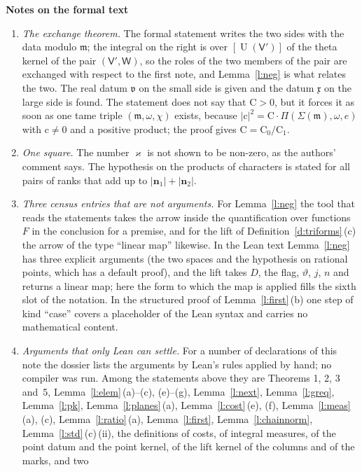 \documentclass[11pt,a4paper]{article}
\newcommand{\sect}[2]{\refstepcounter{section}\label{#2}\par\addvspace{19pt plus 4pt minus 2pt}\Needspace{7\baselineskip}%
  \noindent\llap{{\fontsize{13.2}{16}\selectfont\bfseries\color{inkfaint}\thesection}\hspace{9pt}}%
  {\fontsize{13.2}{16}\selectfont\bfseries\color{ink}#1}\par\nopagebreak\vspace{-1pt}}
\theoremstyle{plainx}
\theoremstyle{uprightx}
\newcommand{\bn}{\mathbf{n}}
\newcommand{\sW}{\mathsf{W}}
\newcommand{\sV}{\mathsf{V}}
\newcommand{\fm}{\mathfrak{m}}
\newcommand{\fv}{\mathfrak{v}}
\newcommand{\fx}{\mathfrak{x}}
\newcommand{\rc}{\mathrm{c}}
\newcommand{\rC}{\mathrm{C}}
\newcommand{\U}{\operatorname{U}}
\newcommand{\LPP}[3]{\Pi(#1,#2,#3)}
\begin{document}
\sect{Notes on the formal text}{s:notes}
\begin{enumerate}[label=\textup{\arabic*.},leftmargin=1.6em,itemsep=5pt]
\item \emph{The exchange theorem.} The formal statement writes the two sides with the data modulo $\fm$; the
integral on the right is over $[\U(\sV')]$ of the theta kernel of the pair $(\sV',\sW)$, so the roles of the two
members of the pair are exchanged with respect to the first note, and Lemma~\ref{l:neg} is what relates the two.
The real datum $\fv$ on the small side is given and the datum $\fx$ on the large side is found. The statement
does not say that $\rC>0$, but it forces it as soon as one tame triple $(\fm,\omega,\chi)$ exists, because
$|\rc|^2=\rC\cdot\LPP{\Sigma(\fm)}{\omega}{e}$ with $\rc\ne0$ and a positive product; the proof gives
$\rC=\rC_0/\rC_1$.
\item \emph{One square.} The number $\varkappa$ is not shown to be non-zero, as the authors' comment says. The
hypothesis on the products of characters is stated for all pairs of ranks that add up to $|\bn_1|+|\bn_2|$.
\item \emph{Three census entries that are not arguments.} For Lemma~\ref{l:neg} the tool that reads the
statements takes the arrow inside the quantification over functions $F$ in the conclusion for a premise, and for
the lift of Definition~\ref{d:triforms}\,(c) the arrow of the type ``linear map'' likewise. In the Lean text
Lemma~\ref{l:neg} has three explicit arguments (the two spaces and the hypothesis on rational points, which has a
default proof), and the lift takes $D$, the flag, $\vartheta$, $j$, $n$ and returns a linear map; here the form
to which the map is applied fills the sixth slot of the notation. In the structured proof of
Lemma~\ref{l:first}\,(b) one step of kind ``case'' covers a placeholder of the Lean syntax and carries no
mathematical content.
\item \emph{Arguments that only Lean can settle.} For a number of declarations of this note the dossier lists the
arguments by Lean's rules applied by hand; no compiler was run. Among the statements above they are Theorems 1,
2, 3 and~5, Lemma~\ref{l:elem}\,(a)--(c), (e)--(g), Lemma~\ref{l:next}, Lemma~\ref{l:greq}, Lemma~\ref{l:pk},
Lemma~\ref{l:planes}\,(a), Lemma~\ref{l:cost}\,(e), (f), Lemma~\ref{l:meas}\,(a), (c), Lemma~\ref{l:ratio}\,(a),
Lemma~\ref{l:first}, Lemma~\ref{l:chainnorm}, Lemma~\ref{l:std}\,(c)\,(ii), the definitions of costs, of integral
measures, of the point datum and the point kernel, of the lift kernel of the columns and of the marks, and two

\end{enumerate}
\end{document}
